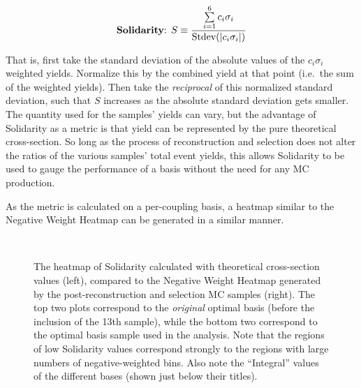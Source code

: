     \begin{equation}
    \textrm{\textbf{Solidarity}: }S \equiv \frac{ \sum\limits_{i=1}^6 c_i\sigma_i }{ \textrm{Stdev}(|c_i\sigma_i|) }
    \end{equation}

    That is, first take the standard deviation of the absolute values of the $c_i\sigma_i$ weighted yields.
    Normalize this by the combined yield at that point (i.e.\ the sum of the weighted yields).
    Then take the \textit{reciprocal} of this normalized standard deviation,
        such that $S$ increases as the absolute standard deviation gets smaller.
    The quantity used for the samples' yields can vary,
        but the advantage of Solidarity as a metric
        is that yield can be represented by the pure theoretical cross-section.
    So long as the process of reconstruction and selection does not alter the ratios of the various samples' total event yields,
        this allows Solidarity to be used to gauge the performance of a basis without the need for any MC production.

    As the metric is calculated on a per-coupling basis,
        a heatmap similar to the Negative Weight Heatmap can be generated in a similar manner.

    \begin{figure}[tbh]
    	\centering
        \\
        \caption{
            The heatmap of Solidarity calculated with theoretical cross-section values (left),
                compared to the Negative Weight Heatmap generated by the post-reconstruction and selection MC samples (right).
            The top two plots correspond to the \textit{original} optimal basis (before the inclusion of the 13th sample),
                while the bottom two correspond to the optimal basis sample used in the analysis.
            Note that the regions of low Solidarity values correspond strongly to the regions with large numbers of negative-weighted bins.
            Also note the ``Integral'' values of the different bases (shown just below their titles).
        }
        \label{fig:solidarity_heatmaps}
    \end{figure}


